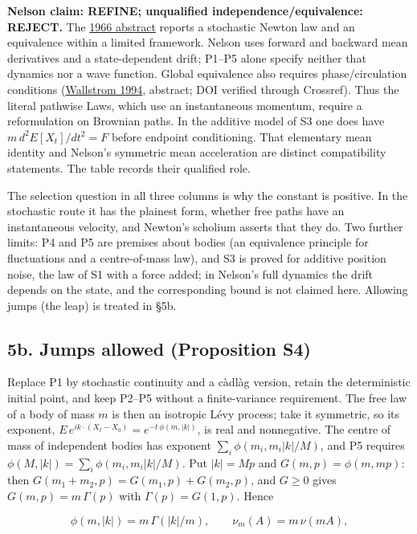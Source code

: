 \documentclass[11pt,a4paper]{article}
\begin{document}
\textbf{Nelson claim: REFINE; unqualified independence/equivalence:
REJECT.} The \href{https://doi.org/10.1103/PhysRev.150.1079}{1966
abstract} reports a stochastic Newton law and an equivalence within a
limited framework. Nelson uses forward and backward mean derivatives and
a state-dependent drift; P1--P5 alone specify neither that dynamics nor
a wave function. Global equivalence also requires phase/circulation
conditions (\href{https://doi.org/10.1103/PhysRevA.49.1613}{Wallstrom
1994}, abstract; DOI verified through Crossref). Thus the literal
pathwise Laws, which use an instantaneous momentum, require a
reformulation on Brownian paths. In the additive model of S3 one does
have \(m\,d^2E[X_t]/dt^2=F\) before endpoint conditioning. That
elementary mean identity and Nelson's symmetric mean acceleration are
distinct compatibility statements. The table records their qualified
role.

The selection question in all three columns is why the constant is
positive. In the stochastic route it has the plainest form, whether free
paths have an instantaneous velocity, and Newton's scholium asserts that
they do. Two further limits: P4 and P5 are premises about bodies (an
equivalence principle for fluctuations and a centre-of-mass law), and S3
is proved for additive position noise, the law of S1 with a force added;
in Nelson's full dynamics the drift depends on the state, and the
corresponding bound is not claimed here. Allowing jumps (the leap) is
treated in §5b.

\hypertarget{b.-jumps-allowed-proposition-s4}{%
\subsection{5b. Jumps allowed (Proposition
S4)}\label{b.-jumps-allowed-proposition-s4}}

Replace P1 by stochastic continuity and a càdlàg version, retain the
deterministic initial point, and keep P2--P5 without a finite-variance
requirement. The free law of a body of mass \(m\) is then an isotropic
Lévy process; take it symmetric, so its exponent,
\(E\,e^{ik\cdot(X_t-X_0)}=e^{-t\,\phi(m,|k|)}\), is real and
nonnegative. The centre of mass of independent bodies has exponent
\(\sum_i\phi(m_i,m_i|k|/M)\), and P5 requires
\(\phi(M,|k|)=\sum_i\phi(m_i,m_i|k|/M)\). Put \(|k|=Mp\) and
\(G(m,p)=\phi(m,mp)\): then \(G(m_1+m_2,p)=G(m_1,p)+G(m_2,p)\), and
\(G\ge0\) gives \(G(m,p)=m\,\Gamma(p)\) with \(\Gamma(p)=G(1,p)\). Hence

\[\phi(m,|k|)=m\,\Gamma(|k|/m),\qquad\nu_m(A)=m\,\nu(mA),\]
\end{document}

